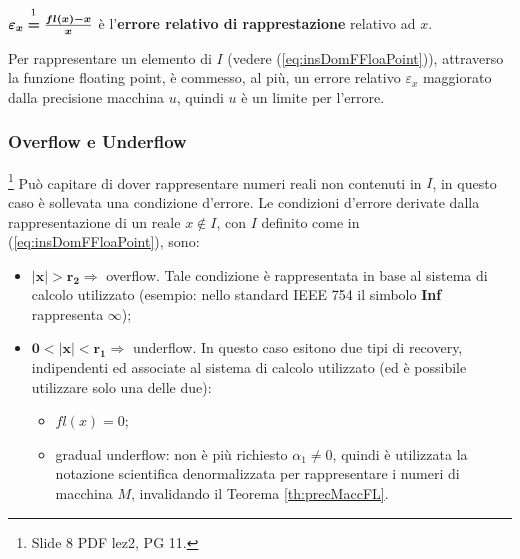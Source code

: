 \addtocounter{footnote}{-2}



\begin{definition}
    $\boldsymbol{\varepsilon_x}\overset{\footnotemark}{\boldsymbol =}\boldsymbol{\frac{fl(x)-x}{x}}$ è l'\textbf{errore relativo di rapprestazione} relativo ad $x$.
\end{definition}

Per rappresentare un elemento di $I$ (vedere (\ref{eq:insDomFFloaPoint})), attraverso la funzione floating point, è commesso, al più, un errore relativo $\varepsilon_x$ maggiorato dalla precisione macchina $u$, quindi $u$ è un limite per l'errore.

\subsubsection{Overflow e Underflow}\footnote{Slide 8 PDF lez2, PG 11.}
Può capitare di dover rappresentare numeri reali non contenuti in $I$, in questo caso è sollevata una condizione d'errore. Le condizioni d'errore derivate dalla rappresentazione di un reale $x\notin I$, con $I$ definito come in (\ref{eq:insDomFFloaPoint}), sono:
\begin{itemize}
    \item $\boldsymbol{|x|>r_2}\Rightarrow$ overflow. Tale condizione è rappresentata in base al sistema di calcolo utilizzato (esempio: nello standard IEEE 754 il simbolo \textbf{Inf} rappresenta $\infty$);
    \item $\boldsymbol{0<|x|<r_1}\Rightarrow$ underflow. In questo caso esitono due tipi di recovery, indipendenti ed associate al sistema di calcolo utilizzato (ed è possibile utilizzare solo una delle due):
    \begin{itemize}
        \item $fl(x)=0$;
        \item gradual underflow: non è più richiesto $\alpha_1\neq 0$, quindi è utilizzata la notazione scientifica denormalizzata per rappresentare i numeri di macchina $M$, invalidando il Teorema \ref{th:precMaccFL}. 
    \end{itemize}
\end{itemize}

